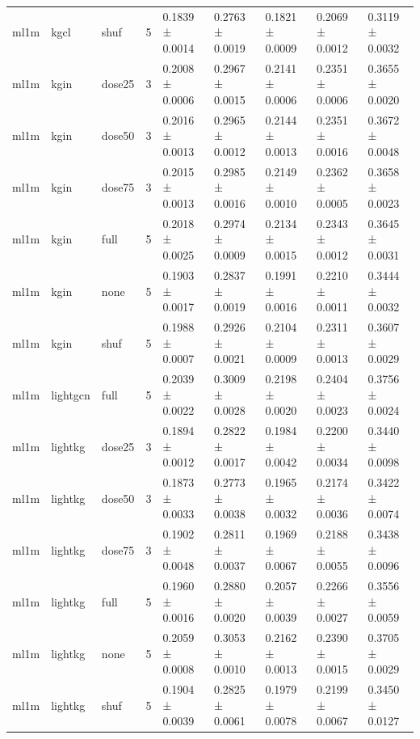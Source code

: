 \begin{table}[t]
\begin{tabular}{lllllllll}
ml1m & kgcl & shuf & 5 & 0.1839 ± 0.0014 & 0.2763 ± 0.0019 & 0.1821 ± 0.0009 & 0.2069 ± 0.0012 & 0.3119 ± 0.0032 \\
ml1m & kgin & dose25 & 3 & 0.2008 ± 0.0006 & 0.2967 ± 0.0015 & 0.2141 ± 0.0006 & 0.2351 ± 0.0006 & 0.3655 ± 0.0020 \\
ml1m & kgin & dose50 & 3 & 0.2016 ± 0.0013 & 0.2965 ± 0.0012 & 0.2144 ± 0.0013 & 0.2351 ± 0.0016 & 0.3672 ± 0.0048 \\
ml1m & kgin & dose75 & 3 & 0.2015 ± 0.0013 & 0.2985 ± 0.0016 & 0.2149 ± 0.0010 & 0.2362 ± 0.0005 & 0.3658 ± 0.0023 \\
ml1m & kgin & full & 5 & 0.2018 ± 0.0025 & 0.2974 ± 0.0009 & 0.2134 ± 0.0015 & 0.2343 ± 0.0012 & 0.3645 ± 0.0031 \\
ml1m & kgin & none & 5 & 0.1903 ± 0.0017 & 0.2837 ± 0.0019 & 0.1991 ± 0.0016 & 0.2210 ± 0.0011 & 0.3444 ± 0.0032 \\
ml1m & kgin & shuf & 5 & 0.1988 ± 0.0007 & 0.2926 ± 0.0021 & 0.2104 ± 0.0009 & 0.2311 ± 0.0013 & 0.3607 ± 0.0029 \\
ml1m & lightgcn & full & 5 & 0.2039 ± 0.0022 & 0.3009 ± 0.0028 & 0.2198 ± 0.0020 & 0.2404 ± 0.0023 & 0.3756 ± 0.0024 \\
ml1m & lightkg & dose25 & 3 & 0.1894 ± 0.0012 & 0.2822 ± 0.0017 & 0.1984 ± 0.0042 & 0.2200 ± 0.0034 & 0.3440 ± 0.0098 \\
ml1m & lightkg & dose50 & 3 & 0.1873 ± 0.0033 & 0.2773 ± 0.0038 & 0.1965 ± 0.0032 & 0.2174 ± 0.0036 & 0.3422 ± 0.0074 \\
ml1m & lightkg & dose75 & 3 & 0.1902 ± 0.0048 & 0.2811 ± 0.0037 & 0.1969 ± 0.0067 & 0.2188 ± 0.0055 & 0.3438 ± 0.0096 \\
ml1m & lightkg & full & 5 & 0.1960 ± 0.0016 & 0.2880 ± 0.0020 & 0.2057 ± 0.0039 & 0.2266 ± 0.0027 & 0.3556 ± 0.0059 \\
ml1m & lightkg & none & 5 & 0.2059 ± 0.0008 & 0.3053 ± 0.0010 & 0.2162 ± 0.0013 & 0.2390 ± 0.0015 & 0.3705 ± 0.0029 \\
ml1m & lightkg & shuf & 5 & 0.1904 ± 0.0039 & 0.2825 ± 0.0061 & 0.1979 ± 0.0078 & 0.2199 ± 0.0067 & 0.3450 ± 0.0127 \\
\hline
\end{tabular}
\end{table}
